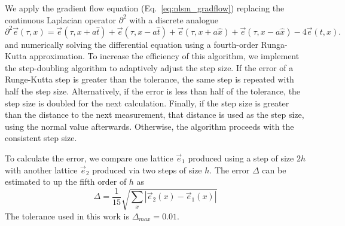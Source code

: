 \documentclass[a4paper,11pt]{article}
\newcommand{\e}{\vec e}
\begin{document}
We apply the gradient flow equation (Eq.~\ref{eq:nlsm_gradflow}) replacing the continuous Laplacian operator $\partial^2$ with a discrete analogue
\begin{equation*}
    \partial^2 \e(\tau,x) = \e(\tau, x+a \hat{t}) + \e(\tau,x-a\hat t) + \e(\tau, x+a \hat{x}) + \e(\tau,x-a\hat x) - 4 \e(t,x).
\end{equation*}
and numerically solving the differential equation using a fourth-order Runga-Kutta approximation. To increase the efficiency of this algorithm, we implement the step-doubling algorithm to adaptively adjust the step size. If the error of a Runge-Kutta step is greater than the tolerance, the same step is repeated with half the step size. Alternatively, if the error is less than half of the tolerance, the step size is doubled for the next calculation. Finally, if the step size is greater than the distance to the next measurement, that distance is used as the step size, using the normal value afterwards. Otherwise, the algorithm proceeds with the consistent step size.

To calculate the error, we compare one lattice $\e_1$ produced using a step of size $2h$ with another lattice $\e_2$ produced via two steps of size $h$. The error $\Delta$ can be estimated to up the fifth order of $h$ as \cite{vetterling1992}
\begin{equation}
\Delta = \frac{1}{15}\sqrt{\sum_x \left| \e_2(x) - \e_1(x) \right|}
\end{equation}
The tolerance used in this work is $\Delta_{max}=0.01$.
\end{document}
